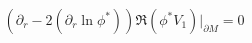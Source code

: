 \begin{equation}
\left( \partial_r -2(\partial_r \ln \phi^* ) \right)\Re 
\left( \phi^* V_1 \right)|_{\partial M}=0  \label{bcV1N}
\end{equation}

